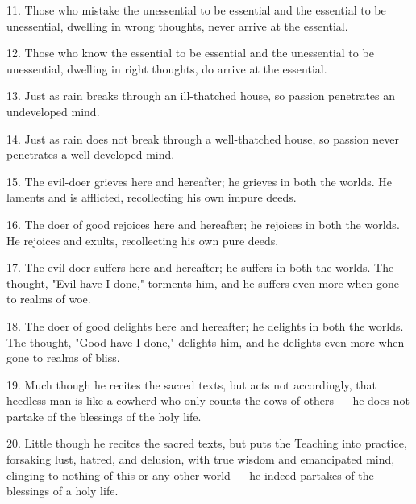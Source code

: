 11. Those who mistake the unessential to be essential and the essential to be unessential, dwelling in wrong thoughts, never arrive at the essential.

12. Those who know the essential to be essential and the unessential to be unessential, dwelling in right thoughts, do arrive at the essential.

13. Just as rain breaks through an ill-thatched house, so passion penetrates an undeveloped mind.

14. Just as rain does not break through a well-thatched house, so passion never penetrates a well-developed mind.

15. The evil-doer grieves here and hereafter; he grieves in both the worlds. He laments and is afflicted, recollecting his own impure deeds.

16. The doer of good rejoices here and hereafter; he rejoices in both the worlds. He rejoices and exults, recollecting his own pure deeds.

17. The evil-doer suffers here and hereafter; he suffers in both the worlds. The thought, "Evil have I done," torments him, and he suffers even more when gone to realms of woe.

18. The doer of good delights here and hereafter; he delights in both the worlds. The thought, "Good have I done," delights him, and he delights even more when gone to realms of bliss.

19. Much though he recites the sacred texts, but acts not accordingly, that heedless man is like a cowherd who only counts the cows of others — he does not partake of the blessings of the holy life.

20. Little though he recites the sacred texts, but puts the Teaching into practice, forsaking lust, hatred, and delusion, with true wisdom and emancipated mind, clinging to nothing of this or any other world — he indeed partakes of the blessings of a holy life.
